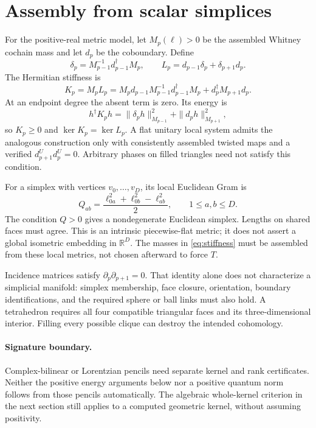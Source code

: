 \documentclass[11pt]{article}
\theoremstyle{definition}
\newcommand{\R}{\mathbb R}
\begin{document}
\section{Assembly from scalar simplices}\label{sec:assembly}
For the positive-real metric model, let $M_p(\ell)>0$ be the assembled
Whitney cochain mass and let $d_p$ be the coboundary. Define
\[
 \delta_p=M_{p-1}^{-1}d_{p-1}^\dagger M_p,\qquad
 L_p=d_{p-1}\delta_p+\delta_{p+1}d_p.
\]
The Hermitian stiffness is
\begin{equation}\label{eq:stiffness}
 K_p=M_pL_p
 =M_pd_{p-1}M_{p-1}^{-1}d_{p-1}^\dagger M_p
   +d_p^\dagger M_{p+1}d_p.
\end{equation}
At an endpoint degree the absent term is zero. Its energy is
\[
 h^\dagger K_ph
 =\|\delta_ph\|_{M_{p-1}}^2+\|d_ph\|_{M_{p+1}}^2,
\]
so $K_p\ge0$ and $\ker K_p=\ker L_p$. A flat unitary local system
admits the analogous construction only with consistently assembled
twisted maps and a verified $d_{p+1}^Ud_p^U=0$.
Arbitrary phases on filled triangles need not satisfy this condition.

For a simplex with vertices $v_0,\ldots,v_D$, its local Euclidean Gram is
\begin{equation}\label{eq:localgram}
 Q_{ab}=\frac{\ell_{0a}^2+\ell_{0b}^2-\ell_{ab}^2}{2},
 \qquad 1\le a,b\le D.
\end{equation}
The condition $Q>0$ gives a nondegenerate Euclidean simplex.
Lengths on shared faces must agree. This is an intrinsic piecewise-flat
metric; it does not assert a global isometric embedding in $\R^D$.
The masses in \eqref{eq:stiffness} must be assembled from these local
metrics, not chosen afterward to force $T$.

Incidence matrices satisfy $\partial_p\partial_{p+1}=0$.
That identity alone does not characterize a simplicial manifold:
simplex membership, face closure, orientation, boundary identifications,
and the required sphere or ball links must also hold.
A tetrahedron requires all four compatible triangular faces and its
three-dimensional interior. Filling every possible clique can destroy
the intended cohomology.

\paragraph{Signature boundary.}
Complex-bilinear or Lorentzian pencils need separate kernel and rank
certificates. Neither the positive energy arguments below nor a
positive quantum norm follows from those pencils automatically.
The algebraic whole-kernel criterion in the next section still applies
to a computed geometric kernel, without assuming positivity.
\end{document}
